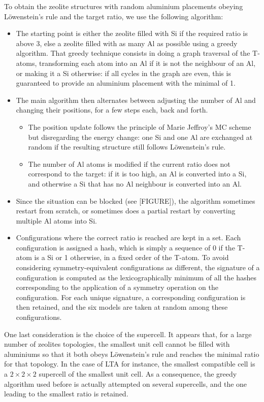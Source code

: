 \documentclass[main.tex]{subfiles}
\begin{document}
To obtain the zeolite structures with random aluminium placements obeying L\"owenstein's rule and the target \SiAl ratio, we use the following algorithm:
\begin{itemize}
    \item The starting point is either the zeolite filled with Si if the required \SiAl ratio is above 3, else a zeolite filled with as many Al as possible using a greedy algorithm. That greedy technique consists in doing a graph traversal of the T-atoms, transforming each atom into an Al if it is not the neighbour of an Al, or making it a Si otherwise: if all cycles in the graph are even, this is guaranteed to provide an aluminium placement with the minimal \SiAl of 1.
    \item The main algorithm then alternates between adjusting the number of Al and changing their positions, for a few steps each, back and forth.
    \begin{itemize}
        \item The position update follows the principle of Marie Jeffroy's MC scheme but disregarding the energy change: one Si and one Al are exchanged at random if the resulting structure still follows L\"owenstein's rule.
        \item The number of Al atoms is modified if the current \SiAl ratio does not correspond to the target: if it is too high, an Al is converted into a Si, and otherwise a Si that has no Al neighbour is converted into an Al.
    \end{itemize}
    \item Since the situation can be blocked (see [FIGURE]), the algorithm sometimes restart from scratch, or sometimes does a partial restart by converting multiple Al atoms into Si.
    \item Configurations where the correct \SiAl ratio is reached are kept in a set. Each configuration is assigned a hash, which is simply a sequence of 0 if the T-atom is a Si or 1 otherwise, in a fixed order of the T-atom. To avoid considering symmetry-equivalent configurations as different, the signature of a configuration is computed as the lexicographically minimum of all the hashes corresponding to the application of a symmetry operation on the configuration. For each unique signature, a corresponding configuration is then retained, and the six models are taken at random among these configurations.
\end{itemize}

One last consideration is the choice of the supercell. It appears that, for a large number of zeolites topologies, the smallest unit cell cannot be filled with aluminiums so that it both obeys L\"owenstein's rule and reaches the minimal \SiAl ratio for that topology. In the case of LTA for instance, the smallest compatible cell is a $2\times2\times2$ supercell of the smallest unit cell. As a consequence, the greedy algorithm used before is actually attempted on several supercells, and the one leading to the smallest \SiAl ratio is retained.
\end{document}
